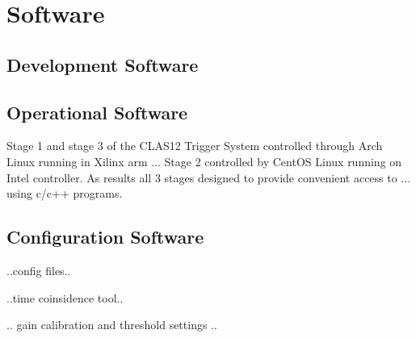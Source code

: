 \section{Software}

\subsection{Development Software}

\subsection{Operational Software}

Stage 1 and stage 3 of the CLAS12 Trigger System controlled through Arch Linux running in Xilinx arm ...
Stage 2 controlled by CentOS Linux running on Intel controller. As results all 3 stages designed to provide convenient access to ...
using c/c++ programs.

\subsection{Configuration Software}

..config files..

..time coinsidence tool..

.. gain calibration and threshold settings ..


